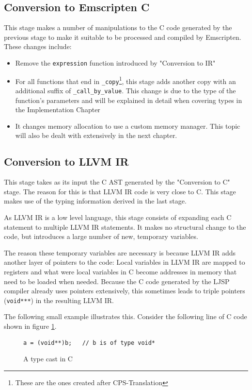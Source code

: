 \documentclass[11pt]{report}
\begin{document}
\subsection{Conversion to Emscripten C}
This stage makes a number of manipulations to the C code generated by the previous stage to make it suitable to be processed and compiled by Emscripten. These changes include:
\begin{itemize}
\item Remove the \texttt{expression} function introduced by "Conversion to IR"
\item For all functions that end in \texttt{_copy}\footnote{These are the ones created after CPS-Translation}, this stage adds another copy with an additional suffix of \texttt{_call_by_value}. This change is due to the type of the function's parameters and will be explained in detail when covering types in the Implementation Chapter
\item It changes memory allocation to use a custom memory manager. This topic will also be dealt with extensively in the next chapter.
\end{itemize}

\subsection{Conversion to LLVM IR}
This stage takes as its input the C AST generated by the "Conversion to C" stage. The reason for this is that LLVM IR code is very close to C. This stage makes use of the typing information derived in the last stage.

As LLVM IR is a low level language, this stage consists of expanding each C statement to multiple LLVM IR statements. It makes no structural change to the code, but introduces a large number of new, temporary variables.

The reason these temporary variables are necessary is because LLVM IR adds another layer of pointers to the code: Local variables in LLVM IR are mapped to registers and what were local variables in C become addresses in memory that need to be loaded when needed. Because the C code generated by the LJSP compiler already uses pointers extensively, this sometimes leads to triple pointers (\texttt{void***}) in the resulting LLVM IR.

The following small example illustrates this. Consider the following line of C code shown in figure \ref{convllvmir1}.
\begin{figure}[ht]
\begin{lstlisting}
a = (void**)b;   // b is of type void*
\end{lstlisting}
\caption{A type cast in C}
\label{convllvmir1}
\end{figure}
\end{document}
